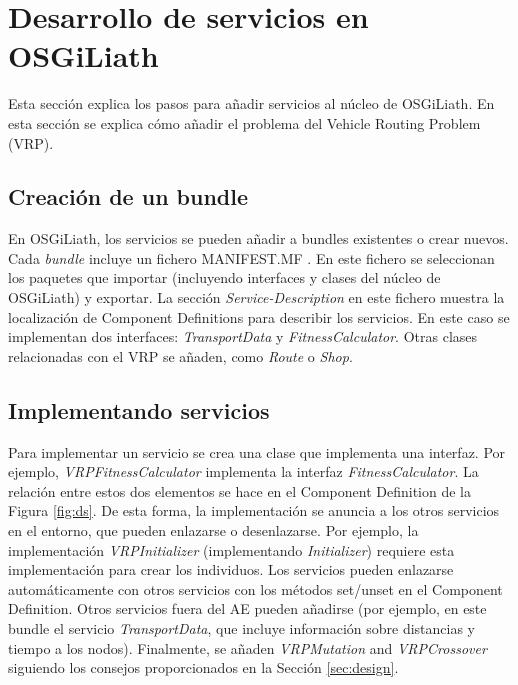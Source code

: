 \documentclass[runningheads]{llncs}
\begin{document}
\section{Desarrollo de servicios en OSGiLiath}
\label{sec:development}

Esta sección explica los pasos para añadir servicios al núcleo de OSGiLiath. En esta sección se explica cómo añadir el problema del Vehicle Routing Problem (VRP).

\subsection{Creación de un bundle}

En OSGiLiath, los servicios se pueden añadir a bundles existentes o crear nuevos. Cada {\em bundle} incluye un fichero MANIFEST.MF . En este fichero se seleccionan los paquetes que importar (incluyendo interfaces y clases del núcleo de OSGiLiath) y exportar. La sección {\em Service-Description} en este fichero muestra la localización de Component Definitions para describir los servicios. En este caso se implementan dos interfaces: {\em TransportData} y {\em FitnessCalculator}. Otras clases relacionadas con el VRP se añaden, como {\em Route} o {\em Shop}.


\subsection{Implementando servicios}
Para implementar un servicio se crea una clase que implementa una interfaz. Por ejemplo,  {\em VRPFitnessCalculator} implementa la interfaz {\em FitnessCalculator}. La relación entre estos dos elementos se hace en el Component Definition de la Figura \ref{fig:ds}. De esta forma, la implementación se anuncia a los otros servicios en el entorno, que pueden enlazarse o desenlazarse. Por ejemplo, la implementación {\em VRPInitializer} (implementando {\em Initializer}) requiere esta implementación para crear los individuos. Los servicios pueden enlazarse automáticamente con otros servicios con los métodos set/unset en el Component Definition. Otros servicios fuera del AE pueden añadirse (por ejemplo, en este bundle el servicio {\em TransportData}, que incluye información sobre distancias y tiempo a los nodos). Finalmente, se añaden {\em VRPMutation} and {\em VRPCrossover} siguiendo los consejos proporcionados en la Sección \ref{sec:design}.
\end{document}
